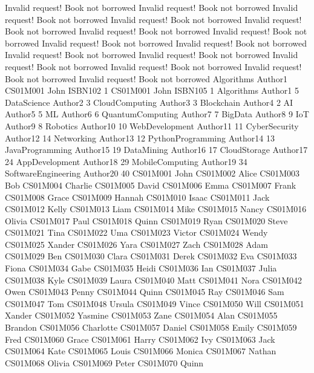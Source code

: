 Invalid request! Book not borrowed
Invalid request! Book not borrowed
Invalid request! Book not borrowed
Invalid request! Book not borrowed
Invalid request! Book not borrowed
Invalid request! Book not borrowed
Invalid request! Book not borrowed
Invalid request! Book not borrowed
Invalid request! Book not borrowed
Invalid request! Book not borrowed
Invalid request! Book not borrowed
Invalid request! Book not borrowed
Invalid request! Book not borrowed
Invalid request! Book not borrowed
Invalid request! Book not borrowed
Algorithms Author1
CS01M001 John ISBN102 1
CS01M001 John ISBN105 1
Algorithms Author1 5
DataScience Author2 3
CloudComputing Author3 3
Blockchain Author4 2
AI Author5 5
ML Author6 6
QuantumComputing Author7 7
BigData Author8 9
IoT Author9 8
Robotics Author10 10
WebDevelopment Author11 11
CyberSecurity Author12 14
Networking Author13 12
PythonProgramming Author14 13
JavaProgramming Author15 19
DataMining Author16 17
CloudStorage Author17 24
AppDevelopment Author18 29
MobileComputing Author19 34
SoftwareEngineering Author20 40
CS01M001 John
CS01M002 Alice
CS01M003 Bob
CS01M004 Charlie
CS01M005 David
CS01M006 Emma
CS01M007 Frank
CS01M008 Grace
CS01M009 Hannah
CS01M010 Isaac
CS01M011 Jack
CS01M012 Kelly
CS01M013 Liam
CS01M014 Mike
CS01M015 Nancy
CS01M016 Olivia
CS01M017 Paul
CS01M018 Quinn
CS01M019 Ryan
CS01M020 Steve
CS01M021 Tina
CS01M022 Uma
CS01M023 Victor
CS01M024 Wendy
CS01M025 Xander
CS01M026 Yara
CS01M027 Zach
CS01M028 Adam
CS01M029 Ben
CS01M030 Clara
CS01M031 Derek
CS01M032 Eva
CS01M033 Fiona
CS01M034 Gabe
CS01M035 Heidi
CS01M036 Ian
CS01M037 Julia
CS01M038 Kyle
CS01M039 Laura
CS01M040 Matt
CS01M041 Nora
CS01M042 Owen
CS01M043 Penny
CS01M044 Quinn
CS01M045 Ray
CS01M046 Sam
CS01M047 Tom
CS01M048 Ursula
CS01M049 Vince
CS01M050 Will
CS01M051 Xander
CS01M052 Yasmine
CS01M053 Zane
CS01M054 Alan
CS01M055 Brandon
CS01M056 Charlotte
CS01M057 Daniel
CS01M058 Emily
CS01M059 Fred
CS01M060 Grace
CS01M061 Harry
CS01M062 Ivy
CS01M063 Jack
CS01M064 Kate
CS01M065 Louis
CS01M066 Monica
CS01M067 Nathan
CS01M068 Olivia
CS01M069 Peter
CS01M070 Quinn